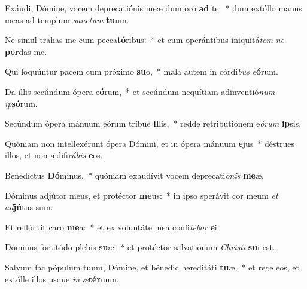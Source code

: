 \item Exáudi, Dómine, vocem deprecatiónis meæ dum oro \textbf{ad} te:~* dum extóllo manus meas ad templum \textit{sanc}\textit{tum} \textbf{tu}um.
\item Ne simul trahas me cum pecca\textbf{tó}ribus:~* et cum operántibus iniquitá\textit{tem} \textit{ne} \textbf{per}das me.
\item Qui loquúntur pacem cum próximo \textbf{su}o,~* mala autem in córdi\textit{bus} \textit{e}\textbf{ó}rum.
\item Da illis secúndum ópera e\textbf{ó}rum,~* et secúndum nequítiam adinventió\textit{num} \textit{ip}\textbf{só}rum.
\item Secúndum ópera mánuum eórum tríbue \textbf{il}lis,~* redde retributiónem e\textit{ó}\textit{rum} \textbf{ip}sis.
\item Quóniam non intellexérunt ópera Dómini, et in ópera mánuum \textbf{e}jus~* déstrues illos, et non ædifi\textit{cá}\textit{bis} \textbf{e}os.
\item Benedíctus \textbf{Dó}minus,~* quóniam exaudívit vocem deprecati\textit{ó}\textit{nis} \textbf{me}æ.
\item Dóminus adjútor meus, et protéctor \textbf{me}us:~* in ipso sperávit cor meum \textit{et} \textit{ad}\textbf{jú}tus sum.
\item Et reflóruit caro \textbf{me}a:~* et ex voluntáte mea confi\textit{té}\textit{bor} \textbf{e}i.
\item Dóminus fortitúdo plebis \textbf{su}æ:~* et protéctor salvatiónum \textit{Chris}\textit{ti} \textbf{su}i est.
\item Salvum fac pópulum tuum, Dómine, et bénedic hereditáti \textbf{tu}æ,~* et rege eos, et extólle illos usque \textit{in} \textit{æ}\textbf{tér}num.
